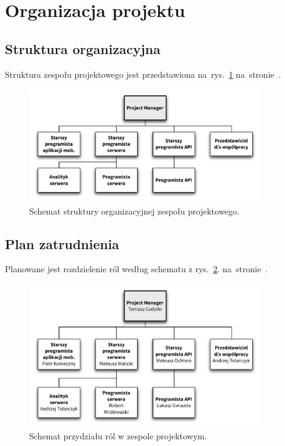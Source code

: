 \newpage
\section{Organizacja projektu}

\subsection{Struktura organizacyjna}
Struktura zespołu projektowego jest przedstawiona
na~rys.~\ref{fig:organizacja:hierarchia}
na~stronie~\pageref{fig:organizacja:hierarchia}.
\begin{figure}[h!]
    \centering
    \includegraphics[width=0.9\textwidth]{./figury/organizacja-projektu/hierarchia}
    \caption{Schemat struktury organizacyjnej zespołu projektowego.}
    \label{fig:organizacja:hierarchia}
\end{figure}

\subsection{Plan zatrudnienia}
Planowane jest rozdzielenie ról według schematu z rys.~\ref{fig:organizacja:plan_zatrudnienia}.
na~stronie~\pageref{fig:organizacja:plan_zatrudnienia}.
\begin{figure}[h!]
    \centering
    \includegraphics[width=0.9\textwidth]{./figury/organizacja-projektu/plan-zatrudnienia}
    \caption{Schemat przydziału ról w zespole projektowym.}
    \label{fig:organizacja:plan_zatrudnienia}
\end{figure}

